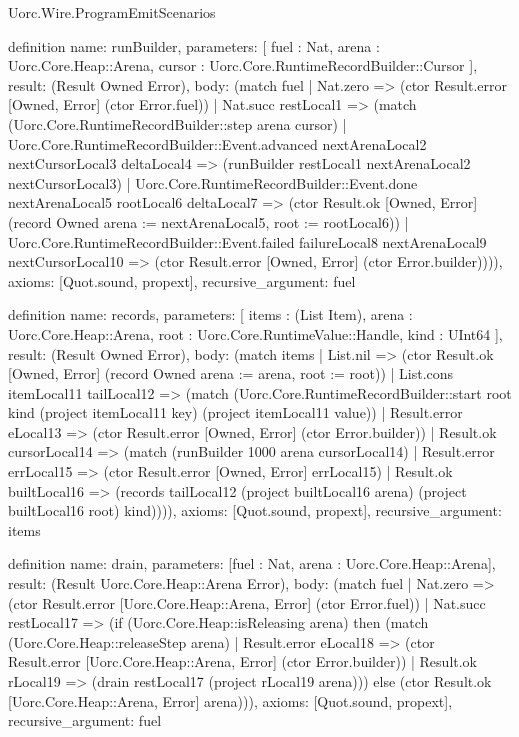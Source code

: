 \begin{lexlean}{Uorc.Wire.ProgramEmitScenarios}
\begin{semanticmodule}
definition{
  name: runBuilder,
  parameters: [
    fuel : Nat,
    arena : Uorc.Core.Heap::Arena,
    cursor : Uorc.Core.RuntimeRecordBuilder::Cursor
  ],
  result: (Result Owned Error),
  body: (match fuel
    | Nat.zero => (ctor Result.error [Owned, Error] (ctor Error.fuel))
    | Nat.succ restLocal1 => (match (Uorc.Core.RuntimeRecordBuilder::step arena cursor)
      | Uorc.Core.RuntimeRecordBuilder::Event.advanced nextArenaLocal2 nextCursorLocal3 deltaLocal4 => (runBuilder restLocal1 nextArenaLocal2 nextCursorLocal3)
      | Uorc.Core.RuntimeRecordBuilder::Event.done nextArenaLocal5 rootLocal6 deltaLocal7 => (ctor Result.ok [Owned, Error] (record Owned {arena := nextArenaLocal5, root := rootLocal6}))
      | Uorc.Core.RuntimeRecordBuilder::Event.failed failureLocal8 nextArenaLocal9 nextCursorLocal10 => (ctor Result.error [Owned, Error] (ctor Error.builder)))),
  axioms: [Quot.sound, propext],
  recursive_argument: fuel
}

definition{
  name: records,
  parameters: [
    items : (List Item),
    arena : Uorc.Core.Heap::Arena,
    root : Uorc.Core.RuntimeValue::Handle,
    kind : UInt64
  ],
  result: (Result Owned Error),
  body: (match items
    | List.nil => (ctor Result.ok [Owned, Error] (record Owned {arena := arena, root := root}))
    | List.cons itemLocal11 tailLocal12 => (match (Uorc.Core.RuntimeRecordBuilder::start root kind (project itemLocal11 key) (project itemLocal11 value))
      | Result.error eLocal13 => (ctor Result.error [Owned, Error] (ctor Error.builder))
      | Result.ok cursorLocal14 => (match (runBuilder 1000 arena cursorLocal14)
        | Result.error errLocal15 => (ctor Result.error [Owned, Error] errLocal15)
        | Result.ok builtLocal16 => (records tailLocal12 (project builtLocal16 arena) (project builtLocal16 root) kind)))),
  axioms: [Quot.sound, propext],
  recursive_argument: items
}

definition{
  name: drain,
  parameters: [fuel : Nat, arena : Uorc.Core.Heap::Arena],
  result: (Result Uorc.Core.Heap::Arena Error),
  body: (match fuel
    | Nat.zero => (ctor Result.error [Uorc.Core.Heap::Arena, Error] (ctor Error.fuel))
    | Nat.succ restLocal17 => (if (Uorc.Core.Heap::isReleasing arena) then (match (Uorc.Core.Heap::releaseStep arena)
      | Result.error eLocal18 => (ctor Result.error [Uorc.Core.Heap::Arena, Error] (ctor Error.builder))
      | Result.ok rLocal19 => (drain restLocal17 (project rLocal19 arena))) else (ctor Result.ok [Uorc.Core.Heap::Arena, Error] arena))),
  axioms: [Quot.sound, propext],
  recursive_argument: fuel
}


\end{semanticmodule}
\end{lexlean}
